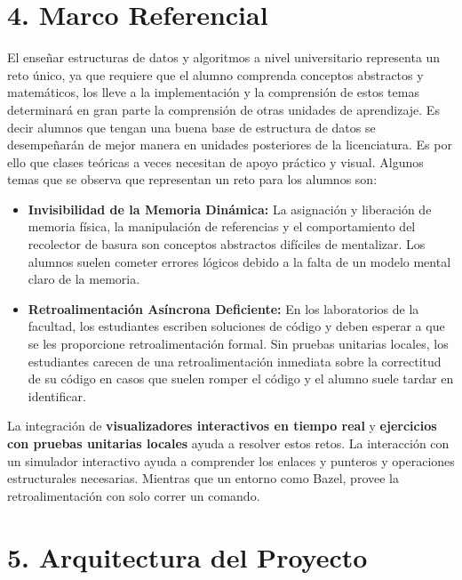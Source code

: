 \documentclass[12 pt]{article}
\begin{document}
\section*{4. Marco Referencial}

El enseñar estructuras de datos y algoritmos a nivel universitario representa un reto único, ya que requiere que el alumno comprenda conceptos abstractos y matemáticos, los lleve a la implementación y la comprensión de estos temas determinará en gran parte la comprensión de otras unidades de aprendizaje. Es decir alumnos que tengan una buena base de estructura de datos se desempeñarán de mejor manera en unidades posteriores de la licenciatura. Es por ello que clases teóricas a veces necesitan de apoyo práctico y visual. Algunos temas que se observa que representan un reto para los alumnos son:

\begin{itemize}
    \item \textbf{Invisibilidad de la Memoria Dinámica:} La asignación y liberación de memoria física, la manipulación de referencias y el comportamiento del recolector de basura son conceptos abstractos difíciles de mentalizar. Los alumnos suelen cometer errores lógicos debido a la falta de un modelo mental claro de la memoria.
    \item \textbf{Retroalimentación Asíncrona Deficiente:} En los laboratorios de la facultad, los estudiantes escriben soluciones de código y deben esperar a que se les proporcione retroalimentación formal. Sin pruebas unitarias locales, los estudiantes carecen de una retroalimentación inmediata sobre la correctitud de su código en casos que suelen romper el código y el alumno suele tardar en identificar.
\end{itemize}

La integración de \textbf{visualizadores interactivos en tiempo real} y \textbf{ejercicios con pruebas unitarias locales} ayuda a resolver estos retos. La interacción con un simulador interactivo ayuda a comprender los enlaces y punteros y operaciones estructurales necesarias. Mientras que un entorno como Bazel, provee la retroalimentación con solo correr un comando.

\section*{5. Arquitectura del Proyecto}
\end{document}
